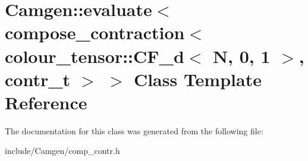 \hypertarget{a00152}{}\section{Camgen\+:\+:evaluate$<$ compose\+\_\+contraction$<$ colour\+\_\+tensor\+:\+:C\+F\+\_\+d$<$ N, 0, 1 $>$, contr\+\_\+t $>$ $>$ Class Template Reference}
\label{a00152}


The documentation for this class was generated from the following file\+:\begin{DoxyCompactItemize}
\item 
include/\+Camgen/comp\+\_\+contr.\+h\end{DoxyCompactItemize}
